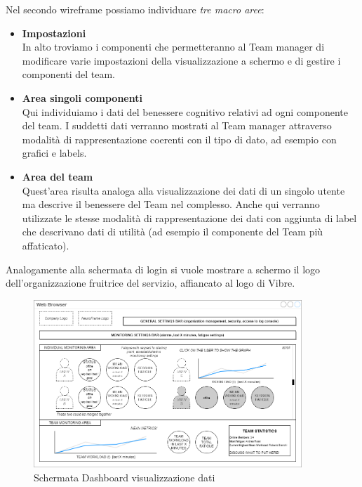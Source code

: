 \noindent Nel secondo wireframe possiamo individuare \emph{tre macro aree}:
\begin{itemize}
  \item \textbf{Impostazioni}\\
  In alto troviamo i componenti che permetteranno al Team manager di modificare varie impostazioni della visualizzazione a schermo e di gestire i componenti del team.
  \item \textbf{Area singoli componenti}\\
  Qui individuiamo i dati del benessere cognitivo relativi ad ogni componente del team.\newline
  I suddetti dati verranno mostrati al Team manager attraverso modalità di rappresentazione coerenti con il tipo di dato, ad esempio con grafici e labels.
  \item \textbf{Area del team}\\
  Quest'area risulta analoga alla visualizzazione dei dati di un singolo utente ma descrive il benessere del Team nel complesso.\newline
  Anche qui verranno utilizzate le stesse modalità di rappresentazione dei dati con aggiunta di label che descrivano dati di utilità (ad esempio il componente del Team più affaticato).
\end{itemize}
Analogamente alla schermata di login si vuole mostrare a schermo il logo dell'organizzazione fruitrice del servizio, affiancato al logo di Vibre.
\begin{figure}[H]
  \centering
  \includegraphics[width=0.9\textwidth]{img/wireframe_dashboard.png}
  \caption{Schermata Dashboard visualizzazione dati}
\end{figure}
\vspace{5mm}